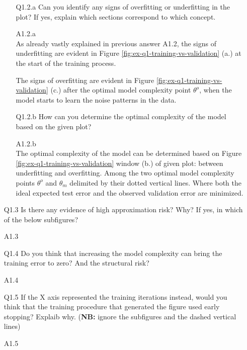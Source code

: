 \documentclass[unicode, 11pt, a4paper]{scrartcl}
\begin{document}
\begin{itemize}
	      \begin{itemize}
		      \item[Q1.2.a] Can you identify any signs of overfitting or underfitting in the plot?
		            If yes, explain which sections correspond to which concept.

		      \item[A1.2.a] ~\\
		            As already vastly explained in previous answer A1.2,
		            the signs of underfitting are evident in Figure \ref{fig:ex-q1-training-vs-validation}
		            (a.) at the start of the training process.

		            The signs of overfitting are evident in Figure \ref{fig:ex-q1-training-vs-validation}
		            (c.) after the optimal model complexity point $\theta^o$,
		            when the model starts to learn the noise patterns in the data.

		      \item[Q1.2.b] How can you determine the optimal complexity of the model based on the given plot?

		      \item[A1.2.b] ~\\
		            The optimal complexity of the model can be determined based on
		            Figure \ref{fig:ex-q1-training-vs-validation}
		            window (b.) of given plot: between underfitting and overfitting.
		            Among the two optimal model complexity points $\theta^o$ and $\theta_m$ delimited by their
		            dotted vertical lines.
		            Where both the ideal expected test error and the observed validation error are minimized.
	      \end{itemize}

	\item[Q1.3] Is there any evidence of high approximation risk? Why?
	      If yes, in which of the below subfigures?

	\item[A1.3] ~\\


	\item[Q1.4] Do you think that increasing the model complexity can bring the training error to zero?
	      And the structural risk?
	\item[A1.4] ~\\

	\item[Q1.5] If the X axis represented the training iterations instead,
	      would you think that the training procedure that generated the figure used early stopping?
	      Explaib why. (\textbf{NB:} ignore the subfigures and the dashed vertical lines)
	\item[A1.5] ~\\

\end{itemize}
\end{document}
